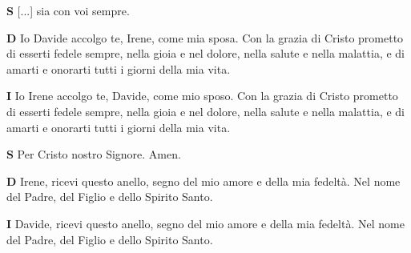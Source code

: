 \documentclass[fontsize=20pt, a5paper]{scrartcl} %
\begin{document}
\textbf{S} [...] sia con voi sempre.

\textbf{D} {Io Davide accolgo te, Irene, come mia sposa. Con la grazia di Cristo prometto di esserti fedele sempre, nella gioia e nel dolore, nella salute e nella malattia, e di amarti e onorarti tutti i giorni della mia vita.}

\textbf{I} Io Irene accolgo te, Davide, come mio sposo. Con la grazia di Cristo prometto di esserti fedele sempre, nella gioia e nel dolore, nella salute e nella malattia, e di amarti e onorarti tutti i giorni della mia vita.

\textbf{S}  Per Cristo nostro Signore. Amen.

\textbf{D} {Irene, ricevi questo anello, segno del mio amore e della mia fedeltà. Nel nome del Padre, del Figlio e dello Spirito Santo.}

\textbf{I} Davide, ricevi questo anello, segno del mio amore e della mia fedeltà. Nel nome del Padre, del Figlio e dello Spirito Santo.
	
\end{document}
